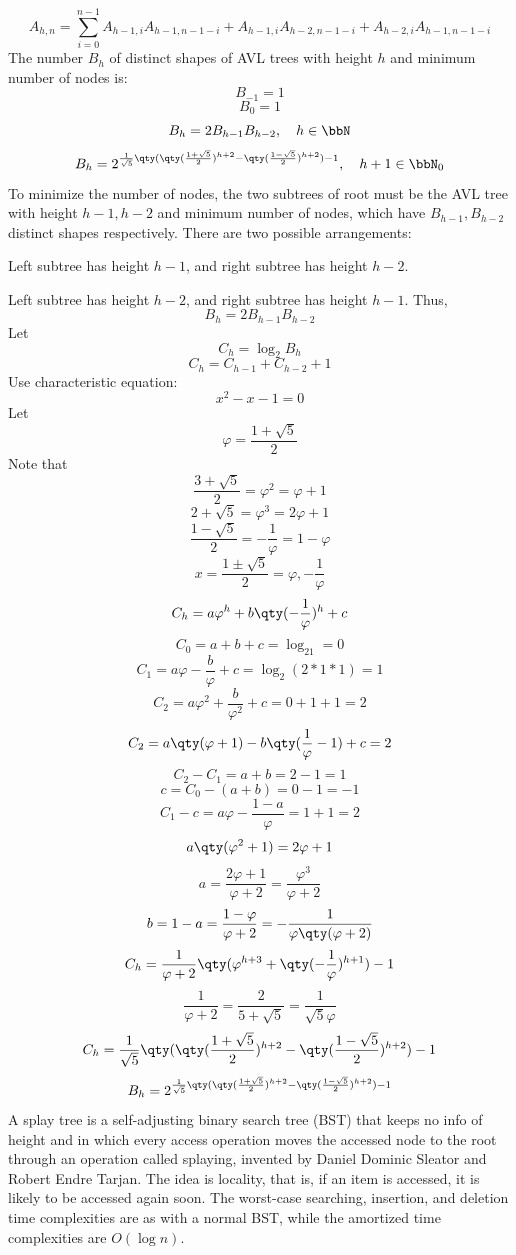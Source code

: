 \documentclass[a4paper,12pt]{article}
\begin{document}
\[A_{h,n}=\sum_{i=0}^{n-1}A_{h-1,i}A_{h-1,n-1-i}+A_{h-1,i}A_{h-2,n-1-i}+A_{h-2,i}A_{h-1,n-1-i}\]
\epr
{}
The number $B_h$ of distinct shapes of AVL trees with height $h$ and minimum number of nodes is:
\[B_{-1}=1\]
\[B_0=1\]
\[B_h=2B_{h-1}B_{h-2},\quad h\in\bbN\]
\[B_h=2^{\frac{1}{\sqrt{5}}\qty(\qty(\frac{1+\sqrt{5}}{2})^{h+2}-\qty(\frac{1-\sqrt{5}}{2})^{h+2})-1},\quad h+1\in\bbN_0\]
\bpr
To minimize the number of nodes, the two subtrees of root must be the AVL tree with height $h-1,h-2$ and minimum number of nodes, which have $B_{h-1},B_{h-2}$ distinct shapes respectively. There are two possible arrangements:
\bit
\item Left subtree has height $h-1$, and right subtree has height $h-2$.
\item Left subtree has height $h-2$, and right subtree has height $h-1$.
\eit
Thus,
\[B_h=2B_{h-1}B_{h-2}\]
Let
\[C_h=\log_2B_h\]
\[C_h=C_{h-1}+C_{h-2}+1\]
Use characteristic equation:
\[x^2-x-1=0\]
Let
\[\varphi=\frac{1+\sqrt{5}}{2}\]
Note that
\[\frac{3+\sqrt{5}}{2}=\varphi^2=\varphi+1\]
\[2+\sqrt{5}=\varphi^3=2\varphi+1\]
\[\frac{1-\sqrt{5}}{2}=-\frac{1}{\varphi}=1-\varphi\]
\[x=\frac{1\pm\sqrt{5}}{2}=\varphi,-\frac{1}{\varphi}\]
\[C_h=a\varphi^h+b\qty(-\frac{1}{\varphi})^h+c\]
\[C_0=a+b+c=\log_21=0\]
\[C_1=a\varphi-\frac{b}{\varphi}+c=\log_2(2*1*1)=1\]
\[C_2=a\varphi^2+\frac{b}{\varphi^2}+c=0+1+1=2\]
\[C_2=a\qty(\varphi+1)-b\qty(\frac{1}{\varphi}-1)+c=2\]
\[C_2-C_1=a+b=2-1=1\]
\[c=C_0-(a+b)=0-1=-1\]
\[C_1-c=a\varphi-\frac{1-a}{\varphi}=1+1=2\]
\[a\qty(\varphi^2+1)=2\varphi+1\]
\[a=\frac{2\varphi+1}{\varphi+2}=\frac{\varphi^3}{\varphi+2}\]
\[b=1-a=\frac{1-\varphi}{\varphi+2}=-\frac{1}{\varphi\qty(\varphi+2)}\]
\[C_h=\frac{1}{\varphi+2}\qty(\varphi^{h+3}+\qty(-\frac{1}{\varphi})^{h+1})-1\]
\[\frac{1}{\varphi+2}=\frac{2}{5+\sqrt{5}}=\frac{1}{\sqrt{5}\varphi}\]
\[C_h=\frac{1}{\sqrt{5}}\qty(\qty(\frac{1+\sqrt{5}}{2})^{h+2}-\qty(\frac{1-\sqrt{5}}{2})^{h+2})-1\]
\[B_h=2^{\frac{1}{\sqrt{5}}\qty(\qty(\frac{1+\sqrt{5}}{2})^{h+2}-\qty(\frac{1-\sqrt{5}}{2})^{h+2})-1}\]
\epr
{}
A splay tree is a self-adjusting binary search tree (BST) that keeps no info of height and in which every access operation moves the accessed node to the root through an operation called splaying, invented by Daniel Dominic Sleator and Robert Endre Tarjan. The idea is locality, that is,  if an item is accessed, it is likely to be accessed again soon. The worst-case searching, insertion, and deletion time complexities are as with a normal BST, while the amortized time complexities are $O(\log n)$.
\end{document}
